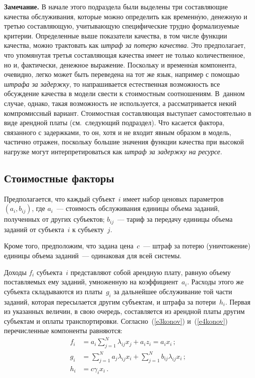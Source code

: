 \begin{multicols}{2}
  \medskip
  
  \noindent
  \textbf{Замечание.} В начале этого подраздела были выделены три составляющие 
качества обслуживания, которые можно определить как временн$\acute{\mbox{у}}$ю, денежную и третью 
составляющую, учитывающую специфические трудно формализуемые критерии. 
Определенные выше показатели качества, в том числе функции качества, можно трактовать 
как \textit{штраф за потерю качества}. Это предполагает, что упомянутая третья 
составляющая качества имеет не только количественное, но и, фактически, денежное 
выражение. Поскольку и временн$\acute{\mbox{а}}$я компонента, очевидно, легко может 
быть переведена на тот же язык, например с помощью \textit{штрафа за задержку}, то 
напрашивается естественная возможность все обсуждение качества в модели свести к 
стоимостным соотношениям. В~данном случае, однако, такая возможность не используется, 
а рассматривается некий компромиссный вариант. Стоимостная составляющая выступает 
самостоятельно в виде арендной платы (см.\ следующий подраздел). Что касается фактора, 
связанного с задержками, то он, хотя и не входит явным образом в модель, частично 
отражен, поскольку большие значения функции качества при высокой нагрузке могут 
интерпретироваться как \textit{штраф за задержку на ресурсе}.

\subsection{Стоимостные факторы}

  Предполагается, что каждый субъект~$i$ имеет набор ценовых параметров $(a_i,b_{ij})$, 
где $a_i$~--- стоимость обслуживания единицы объема заданий, полученных от других 
субъектов; $b_{ij}$~--- тариф за передачу единицы объема заданий от субъекта~$i$ к 
субъекту~$j$.
  
  Кроме того, предположим, что задана цена~$c$~--- штраф за потерю (уничтожение) 
единицы объема заданий~--- одинаковая для всей системы.
  
  Доходы  $f_i$ субъекта~$i$ представляют собой арендную плату, равную объему 
поставляемых ему заданий, умноженную на коэффициент~$a_i$. Расходы этого же субъекта 
складываются из платы~$g_i$ за дальнейшее обслуживание той части заданий, которая 
пересылается другим субъектам, и штрафа за потери~$h_i$. Первая из указанных величин, в 
свою очередь, составляется из арендной платы другим субъектам и оплаты транспортировки. 
Согласно~(\ref{e3konov}) и~(\ref{e4konov}) перечисленные компоненты равняются:
  \begin{align*}
  f_i & = a_i\sum\limits_{j=1}^N \lambda_{ij}x_j+a_iz_i=a_ix_i\,;\\
  g_i & = \sum\limits_{j=1}^N 
a_j\lambda_{ij}x_i+\sum\limits_{j=1}^Nb_{ij}\lambda_{ij}x_i\,;\\
  h_i& = c\gamma_i x_i\,.
  \end{align*}


\end{multicols}
